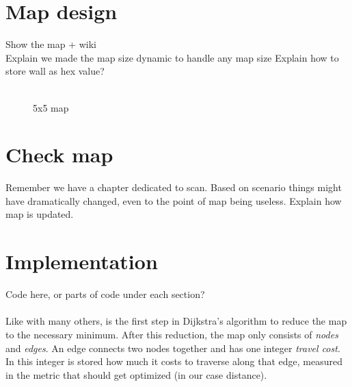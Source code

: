 \section{Map design}
\label{sec:map_design} %
Show the map + wiki\\
Explain we made the map size dynamic to handle any map size
Explain how to store wall as hex value?\\
\\
\begin{figure}[htp]
    \centering
    \hspace{0.2\textwidth}
    \caption{5x5 map}
    \label{fig:5x5map}
\end{figure}

\section{Check map}
\label{sec:map_check} %
Remember we have a chapter dedicated to scan.\linebreak
Based on scenario things might have dramatically changed, even to the point of map being useless. Explain how map is updated.

\section{Implementation}
\label{sec:map} %
Code here, or parts of code under each section?\\
\\
Like with many others,
is the first step in Dijkstra's algorithm to reduce the map to the necessary minimum.
After this reduction, the map only consists of \emph{nodes} and \emph{edges}.
An edge connects two nodes together and has one integer \emph{travel cost}.
In this integer is stored how much it costs to traverse along that edge,
measured in the metric that should get optimized (in our case distance).


